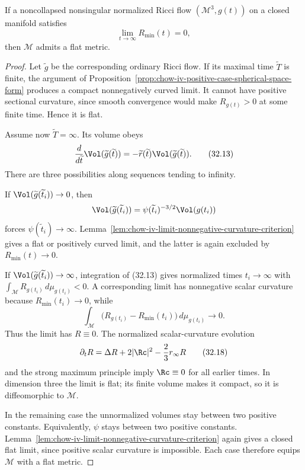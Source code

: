 \begin{proposition}
\label{prop:chow-iv-zero-case-flat-metric}
If a noncollapsed nonsingular normalized Ricci flow
$(\mathcal M^3,g(t))$ on a closed manifold satisfies
\[
 \lim_{t\to\infty}R_{\min}(t)=0,
\]
then $\mathcal M$ admits a flat metric.
\end{proposition}
\begin{proof}
\sketch
Let $\widetilde g$ be the corresponding ordinary Ricci flow.  If its
maximal time $\widetilde T$ is finite, the argument of
Proposition~\ref{prop:chow-iv-positive-case-spherical-space-form} produces a
compact nonnegatively curved limit.  It cannot have positive sectional
curvature, since smooth convergence would make $R_{g(t)}>0$ at some finite
time.  Hence it is flat.

Assume now $\widetilde T=\infty$.  Its volume obeys
\begin{equation*}
 \frac d{d\widetilde t}\Vol(\widetilde g(\widetilde t))
 =-\widetilde r(\widetilde t)\Vol(\widetilde g(\widetilde t)).
 \tag{32.13}
\end{equation*}
There are three possibilities along sequences tending to infinity.

If $\Vol(\widetilde g(\widetilde t_i))\to0$, then
\[
 \Vol(\widetilde g(\widetilde t_i))
 =\psi(\widetilde t_i)^{-3/2}\Vol(g(t_i))
\]
forces $\psi(\widetilde t_i)\to\infty$.  Lemma~\ref{lem:chow-iv-limit-nonnegative-curvature-criterion}
gives a flat or positively curved limit, and the latter is again excluded by
$R_{\min}(t)\to0$.

If $\Vol(\widetilde g(\widetilde t_i))\to\infty$, integration of (32.13)
gives normalized times $t_i\to\infty$ with
$\int_{\mathcal M}R_{g(t_i)}\,d\mu_{g(t_i)}<0$.  A corresponding limit has
nonnegative scalar curvature because $R_{\min}(t_i)\to0$, while
\[
 \int_{\mathcal M}
 \bigl(R_{g(t_i)}-R_{\min}(t_i)\bigr)\,d\mu_{g(t_i)}\longrightarrow0.
\]
Thus the limit has $R\equiv0$.  The normalized scalar-curvature evolution
\[
 \partial_tR=\Delta R+2|\Rc|^2-\frac23r_\infty R
 \tag{32.18}
\]
and the strong maximum principle imply $\Rc\equiv0$ for all earlier times.
In dimension three the limit is flat; its finite volume makes it compact,
so it is diffeomorphic to $\mathcal M$.

In the remaining case the unnormalized volumes stay between two positive
constants.  Equivalently, $\psi$ stays between two positive constants.
Lemma~\ref{lem:chow-iv-limit-nonnegative-curvature-criterion} again gives a
closed flat limit, since positive scalar curvature is impossible.  Each
case therefore equips $\mathcal M$ with a flat metric.
\end{proof}

